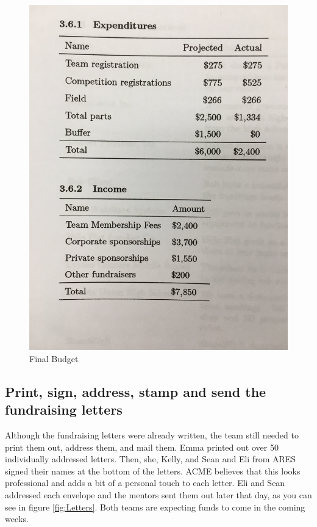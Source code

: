 \documentclass{article}
\begin{document}
\begin{figure}
    \centering
    \includegraphics[width=.6 \textwidth]{07_10-15/images/budget.JPG}
    \caption{Final Budget}
    \label{fig: budget}
\end{figure}

\subsection{Print, sign, address, stamp and send the fundraising letters}
Although the fundraising letters were already written, the team still needed to print them out, address them, and mail them. Emma printed out over 50 individually addressed letters. Then, she, Kelly, and Sean and Eli from ARES signed their names at the bottom of the letters. ACME believes that this looks professional and adds a bit of a personal touch to each letter.  Eli and Sean addressed each envelope and the mentors sent them out later that day, as you can see in figure \ref{fig:Letters}. Both teams are expecting funds to come in the coming weeks. 
\end{document}
